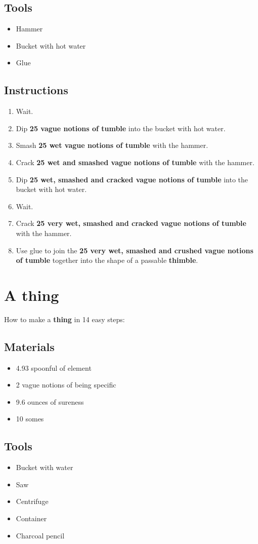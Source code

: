 \documentclass{article}
\begin{document}
\subsection{Tools}\begin{itemize}
\item 
Hammer
\item 
Bucket with hot water
\item 
Glue
\end{itemize}
\subsection{Instructions}\begin{enumerate}
\item 
Wait.
\item 
Dip \textbf{25 vague notions of tumble} into the bucket with hot water.
\item 
Smash \textbf{25 wet vague notions of tumble} with the hammer.
\item 
Crack \textbf{25 wet and smashed vague notions of tumble} with the hammer.
\item 
Dip \textbf{25 wet, smashed and cracked vague notions of tumble} into the bucket with hot water.
\item 
Wait.
\item 
Crack \textbf{25 very wet, smashed and cracked vague notions of tumble} with the hammer.
\item 
Use glue to join the \textbf{25 very wet, smashed and crushed vague notions of tumble} together into the shape of a passable \textbf{thimble}.
\end{enumerate}
\newpage
\section{A thing}How to make a \textbf{thing} in 14 easy steps:

\subsection{Materials}\begin{itemize}
\item 
4.93 spoonful of element
\item 
2 vague notions of being specific
\item 
9.6 ounces of sureness
\item 
10 somes
\end{itemize}
\subsection{Tools}\begin{itemize}
\item 
Bucket with water
\item 
Saw
\item 
Centrifuge
\item 
Container
\item 
Charcoal pencil
\end{itemize}
\end{document}
